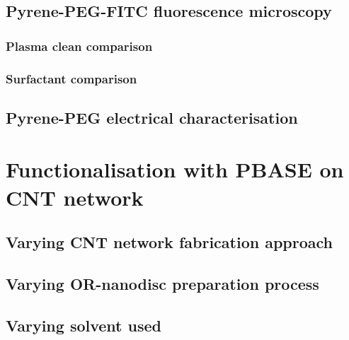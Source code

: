 \documentclass[
  a4paper,
]{scrbook}
\begin{document}
\hypertarget{pyrene-peg-fitc-fluorescence-microscopy}{%
\subsection{Pyrene-PEG-FITC fluorescence
microscopy}\label{pyrene-peg-fitc-fluorescence-microscopy}}

\hypertarget{plasma-clean-comparison}{%
\subsubsection*{Plasma clean comparison}\label{plasma-clean-comparison}}

\hypertarget{surfactant-comparison}{%
\subsubsection*{Surfactant comparison}\label{surfactant-comparison}}

\hypertarget{pyrene-peg-electrical-characterisation}{%
\subsection{Pyrene-PEG electrical
characterisation}\label{pyrene-peg-electrical-characterisation}}

\hypertarget{functionalisation-with-pbase-on-cnt-network}{%
\section{Functionalisation with PBASE on CNT
network}\label{functionalisation-with-pbase-on-cnt-network}}

\hypertarget{sec-cnt-deposition-effects}{%
\subsection{Varying CNT network fabrication
approach}\label{sec-cnt-deposition-effects}}

\hypertarget{varying-or-nanodisc-preparation-process}{%
\subsection{Varying OR-nanodisc preparation
process}\label{varying-or-nanodisc-preparation-process}}

\hypertarget{varying-solvent-used}{%
\subsection{Varying solvent used}\label{varying-solvent-used}}
\end{document}
